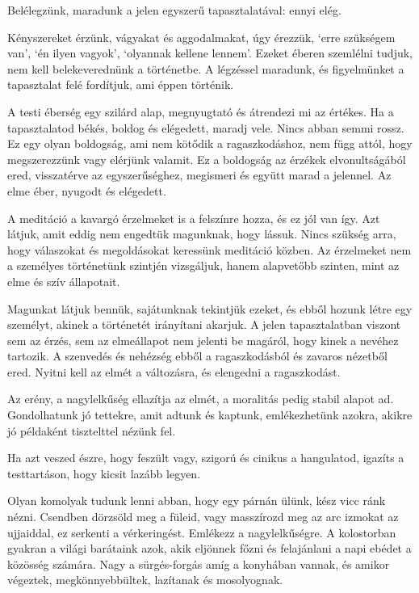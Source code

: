
Belélegzünk, maradunk a jelen egyszerű tapasztalatával: ennyi elég.

Kényszereket érzünk, vágyakat és aggodalmakat, úgy érezzük, `erre
szükségem van', `én ilyen vagyok', `olyannak kellene lennem'. Ezeket
éberen szemlélni tudjuk, nem kell belekeverednünk a történetbe. A
légzéssel maradunk, és figyelmünket a tapasztalat felé fordítjuk, ami
éppen történik.

A testi éberség egy szilárd alap, megnyugtató és átrendezi mi az
értékes. Ha a tapasztalatod békés, boldog és elégedett, maradj vele.
Nincs abban semmi rossz. Ez egy olyan boldogság, ami nem kötődik a
ragaszkodáshoz, nem függ attól, hogy megszerezzünk vagy elérjünk
valamit. Ez a boldogság az érzékek elvonultságából ered, visszatérve az
egyszerűséghez, megismeri és együtt marad a jelennel. Az elme éber,
nyugodt és elégedett.

A meditáció a kavargó érzelmeket is a felszínre hozza, és ez jól van
így. Azt látjuk, amit eddig nem engedtük magunknak, hogy lássuk. Nincs
szükség arra, hogy válaszokat és megoldásokat keressünk meditáció
közben. Az érzelmeket nem a személyes történetünk szintjén vizsgáljuk,
hanem alapvetőbb szinten, mint az elme és szív állapotait.

Magunkat látjuk bennük, sajátunknak tekintjük ezeket, és ebből hozunk
létre egy személyt, akinek a történetét irányítani akarjuk. A jelen
tapasztalatban viszont sem az érzés, sem az elmeállapot nem jelenti be
magáról, hogy kinek a nevéhez tartozik. A szenvedés és nehézség ebből a
ragaszkodásból és zavaros nézetből ered. Nyitni kell az elmét a
változásra, és elengedni a ragaszkodást.


Az erény, a nagylelkűség ellazítja az elmét, a moralitás pedig stabil
alapot ad. Gondolhatunk jó tettekre, amit adtunk és kaptunk,
emlékezhetünk azokra, akikre jó példaként tisztelttel nézünk fel.

Ha azt veszed észre, hogy feszült vagy, szigorú és cinikus a hangulatod,
igazíts a testtartáson, hogy kicsit lazább legyen.

Olyan komolyak tudunk lenni abban, hogy egy párnán ülünk, kész vicc ránk
nézni. Csendben dörzsöld meg a füleid, vagy masszírozd meg az arc
izmokat az ujjaiddal, ez serkenti a vérkeringést. Emlékezz a
nagylelkűségre. A kolostorban gyakran a világi barátaink azok, akik
eljönnek főzni és felajánlani a napi ebédet a közösség számára. Nagy a
sürgés-forgás amíg a konyhában vannak, és amikor végeztek,
megkönnyebbültek, lazítanak és mosolyognak.


